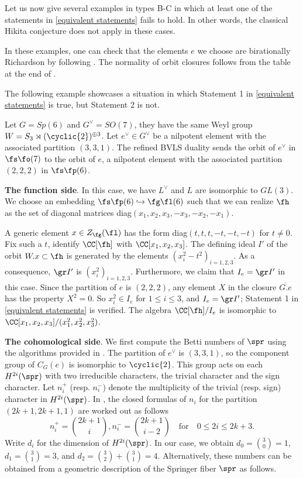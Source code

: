 \documentclass[12pt]{amsart}
\begin{document}
Let us now give several examples in types B-C in which at least one of the statements in \cref{equivalent statements} fails to hold. In other words, the classical Hikita conjecture does not apply in these cases.

In these examples, one can check that the elements $e$ we choose are birationally Richardson by following \cite[Section 3]{Fu_2003}. The normality of orbit closures follows from the table at the end of \cite{Kraft-Procesi}.

The following example showcases a situation in which Statement 1 in \cref{equivalent statements} is true, but Statement 2 is not.
\begin{example} \label{gl3 in B}
Let $G= Sp(6)$ and $G^\vee= SO(7)$, they have the same Weyl group $W= S_3\rtimes (\cyclic{2})^{\oplus 3}$. Let $e^\vee\in G^\vee$ be a nilpotent element with the associated partition $(3,3,1)$. The refined BVLS duality sends the orbit of $e^\vee$ in $\fs\fo(7)$ to the orbit of $e$, a nilpotent element with the associated partition $(2,2,2)$ in $\fs\fp(6)$.

\textbf{The function side}. In this case, we have $L^\vee$ and $L$ are isomorphic to $GL(3)$. We choose an embedding $\fs\fp(6)\hookrightarrow \fg\fl(6)$ such that we can realize $\fh$ as the set of diagonal matrices diag$(x_1,x_2,x_3, -x_3,-x_2,-x_1)$.

A generic element $x\in Z_\fg(\fl)$ has the form diag$(t,t,t,-t,-t,-t)$ for $t\neq 0$. Fix such a $t$, identify $\CC[\fh]$ with $\CC[x_1,x_2,x_3]$. The defining ideal $I'$ of the orbit $W.x\subset \fh$ is generated by the elements $(x_i^2- t^2)_{i=1,2,3}$. As a consequence, $\gr I'$ is $(x_i^2)_{i=1,2,3}$. Furthermore, we claim that $I_e= \gr I'$ in this case. Since the partition of $e$ is $(2,2,2)$, any element $X$ in the closure $\overline{G.e}$ has the property $X^2=0$. So $x_i^2\in I_e$ for $1\leqslant i\leqslant 3$, and $I_e= \gr I'$; Statement 1 in \cref{equivalent statements} is verified. The algebra $\CC[\fh]/ I_e$ is isomorphic to $\CC[x_1,x_2, x_3]/(x_1^{2}, x_2^{2}, x_3^{2})$.

\textbf{The cohomological side}. We first compute the Betti numbers of $\spr$ using the algorithms provided in \cite[Section 8]{Kim2018}. The partition of $e^\vee$ is $(3,3,1)$, so the component group of $C_G(e)$ is isomorphic to $\cyclic{2}$. This group acts on each $H^{2i}(\spr)$ with two irreducible characters, the trivial character and the sign character. Let $n_i^{+}$ (resp. $n_i^{-}$) denote the multiplicity of the trivial (resp. sign) character in $H^{2i}(\spr)$. In \cite[Proposition 8.2]{Kim2018}, the closed formulas of $n_i$ for the partition $(2k+1, 2k+1, 1)$ are worked out as follows
$$n_i^+= {2k+ 1 \choose i}, n_i^{-}= {2k+1\choose i-2} \quad \text{for} \quad 0\leqslant 2i\leqslant 2k+3.$$
Write $d_i$ for the dimension of $H^{2i}(\spr)$. In our case, we obtain $d_0= {3\choose 0} = 1$, $d_1= {3\choose 1}= 3$, and $d_2= {3\choose 2}+ {3\choose 1}= 4$. Alternatively, these numbers can be obtained from a geometric description of the Springer fiber $\spr$ as follows.


\end{example}
\end{document}
